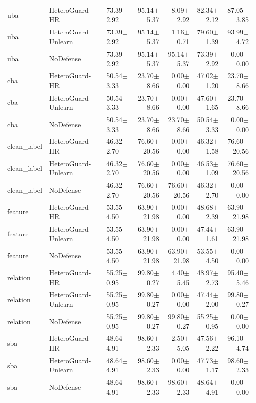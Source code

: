 \begin{table}[t]
\begin{tabular}{lllrrrr}
uba & HeteroGuard-HR & 73.39$\pm$2.92 & 95.14$\pm$5.37 & 8.09$\pm$2.92 & 82.34$\pm$2.12 & 87.05$\pm$3.85 \\
uba & HeteroGuard-Unlearn & 73.39$\pm$2.92 & 95.14$\pm$5.37 & 1.16$\pm$0.71 & 79.60$\pm$1.39 & 93.99$\pm$4.72 \\
uba & NoDefense & 73.39$\pm$2.92 & 95.14$\pm$5.37 & 95.14$\pm$5.37 & 73.39$\pm$2.92 & 0.00$\pm$0.00 \\
cba & HeteroGuard-HR & 50.54$\pm$3.33 & 23.70$\pm$8.66 & 0.00$\pm$0.00 & 47.02$\pm$1.20 & 23.70$\pm$8.66 \\
cba & HeteroGuard-Unlearn & 50.54$\pm$3.33 & 23.70$\pm$8.66 & 0.00$\pm$0.00 & 47.60$\pm$1.65 & 23.70$\pm$8.66 \\
cba & NoDefense & 50.54$\pm$3.33 & 23.70$\pm$8.66 & 23.70$\pm$8.66 & 50.54$\pm$3.33 & 0.00$\pm$0.00 \\
clean_label & HeteroGuard-HR & 46.32$\pm$2.70 & 76.60$\pm$20.56 & 0.00$\pm$0.00 & 46.32$\pm$1.58 & 76.60$\pm$20.56 \\
clean_label & HeteroGuard-Unlearn & 46.32$\pm$2.70 & 76.60$\pm$20.56 & 0.00$\pm$0.00 & 46.53$\pm$1.09 & 76.60$\pm$20.56 \\
clean_label & NoDefense & 46.32$\pm$2.70 & 76.60$\pm$20.56 & 76.60$\pm$20.56 & 46.32$\pm$2.70 & 0.00$\pm$0.00 \\
feature & HeteroGuard-HR & 53.55$\pm$4.50 & 63.90$\pm$21.98 & 0.00$\pm$0.00 & 48.68$\pm$2.39 & 63.90$\pm$21.98 \\
feature & HeteroGuard-Unlearn & 53.55$\pm$4.50 & 63.90$\pm$21.98 & 0.00$\pm$0.00 & 47.44$\pm$1.61 & 63.90$\pm$21.98 \\
feature & NoDefense & 53.55$\pm$4.50 & 63.90$\pm$21.98 & 63.90$\pm$21.98 & 53.55$\pm$4.50 & 0.00$\pm$0.00 \\
relation & HeteroGuard-HR & 55.25$\pm$0.95 & 99.80$\pm$0.27 & 4.40$\pm$5.45 & 48.97$\pm$2.73 & 95.40$\pm$5.46 \\
relation & HeteroGuard-Unlearn & 55.25$\pm$0.95 & 99.80$\pm$0.27 & 0.00$\pm$0.00 & 47.44$\pm$2.00 & 99.80$\pm$0.27 \\
relation & NoDefense & 55.25$\pm$0.95 & 99.80$\pm$0.27 & 99.80$\pm$0.27 & 55.25$\pm$0.95 & 0.00$\pm$0.00 \\
sba & HeteroGuard-HR & 48.64$\pm$4.91 & 98.60$\pm$2.33 & 2.50$\pm$5.05 & 47.56$\pm$2.22 & 96.10$\pm$4.74 \\
sba & HeteroGuard-Unlearn & 48.64$\pm$4.91 & 98.60$\pm$2.33 & 0.00$\pm$0.00 & 47.73$\pm$1.17 & 98.60$\pm$2.33 \\
sba & NoDefense & 48.64$\pm$4.91 & 98.60$\pm$2.33 & 98.60$\pm$2.33 & 48.64$\pm$4.91 & 0.00$\pm$0.00 \\

\end{tabular}
\end{table}
